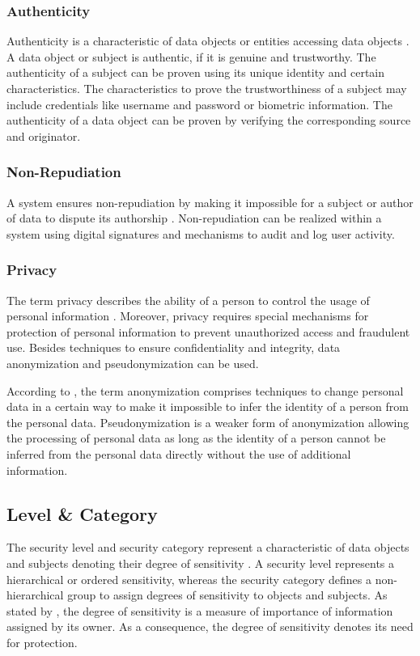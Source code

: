 \subsubsection{Authenticity}
Authenticity is a characteristic of data objects or entities accessing data objects \cite{Eckert2023}.
A data object or subject is authentic, if it is genuine and trustworthy.
The authenticity of a subject can be proven using its unique identity and certain characteristics.
The characteristics to prove the trustworthiness of a subject may include credentials like username and password or biometric information.
The authenticity of a data object can be proven by verifying the corresponding source and originator.

\subsubsection{Non-Repudiation}
A system ensures non-repudiation by making it impossible for a subject or author of data to dispute its authorship \cite{Eckert2023}.
Non-repudiation can be realized within a system using digital signatures and mechanisms to audit and log user activity.

\subsubsection{Privacy}
The term privacy describes the ability of a person to control the usage of personal information \cite{Eckert2023}.
Moreover, privacy requires special mechanisms for protection of personal information to prevent unauthorized access and fraudulent use.
Besides techniques to ensure confidentiality and integrity, data anonymization and pseudonymization can be used.

According to \citeauthor{Eckert2023} \cite{Eckert2023}, the term anonymization comprises techniques to change personal data in a certain way to make it impossible to infer the identity of a person from the personal data.
Pseudonymization is a weaker form of anonymization allowing the processing of personal data as long as the identity of a person cannot be inferred from the personal data directly without the use of additional information.

\subsection{Level \& Category}
The security level and security category represent a characteristic of data objects and subjects denoting their degree of sensitivity \cite{Stine2008}.
A security level represents a hierarchical or ordered sensitivity, whereas the security category defines a non-hierarchical group to assign degrees of sensitivity to objects and subjects.
As stated by \citeauthor{Stine2008} \cite{Stine2008}, the degree of sensitivity is a measure of importance of information assigned by its owner.
As a consequence, the degree of sensitivity denotes its need for protection.

